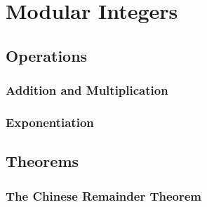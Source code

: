 \section{Modular Integers}





\subsection{Operations}

\subsubsection{Addition and Multiplication}

\subsubsection{Exponentiation}


\subsection{Theorems}


\subsubsection{The Chinese Remainder Theorem}

